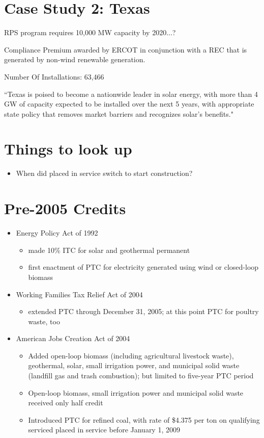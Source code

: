 \documentclass[11pt, oneside]{article}   	%
\begin{document}
\section{Case Study 2: Texas} 

RPS program requires 10,000 MW capacity by 2020...? 

Compliance Premium awarded by ERCOT in conjunction with a REC that is generated by non-wind renewable generation.

 
Number Of Installations: 63,466

``Texas is poised to become a nationwide leader in solar energy, with more than 4 GW of capacity expected to be installed over the next 5 years, with appropriate state policy that removes market barriers and recognizes solar's benefits."

\section{Things to look up}
\begin{itemize}
\item When did placed in service switch to start construction? 
\end{itemize}

\section{Pre-2005 Credits}
\begin{itemize}
\item Energy Policy Act of 1992
\begin{itemize}
\item made 10\% ITC for solar and geothermal permanent
\item first enactment of PTC for electricity generated using wind or closed-loop biomass 
\end{itemize}

\item Working Families Tax Relief Act of 2004
\begin{itemize}
\item extended PTC through December 31, 2005; at this point PTC for poultry waste, too
\end{itemize}

\item American Jobs Creation Act of 2004 
\begin{itemize}
\item Added open-loop biomass (including agricultural livestock waste), geothermal, solar, small irrigation power, and municipal solid waste (landfill gas and trash combustion); but limited to five-year PTC period
\item Open-loop biomass, small irrigation power and municipal solid waste received only half credit
\item Introduced PTC for refined coal, with rate of \$4.375 per ton on qualifying serviced placed in service before January 1, 2009
\end{itemize}

\end{itemize}
\end{document}
